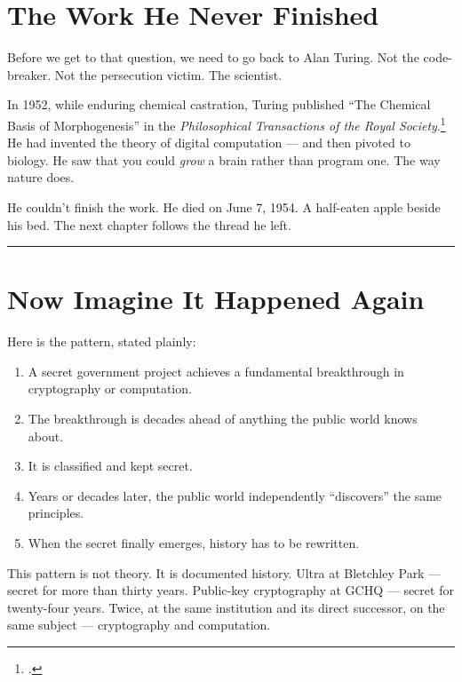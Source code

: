 \section*{The Work He Never Finished}
\label{spine:cw-the-work-he-never-finished}

Before we get to that question, we need to go back to Alan Turing. Not the code-breaker. Not the persecution victim. The scientist.

In 1952, while enduring chemical castration, Turing published ``The Chemical Basis of Morphogenesis'' in the \textit{Philosophical Transactions of the Royal Society}.\footcite{turing1952} He had invented the theory of digital computation --- and then pivoted to biology. He saw that you could \textit{grow} a brain rather than program one. The way nature does.

He couldn't finish the work. He died on June 7, 1954. A half-eaten apple beside his bed. The next chapter follows the thread he left.

\vspace{1cm}\noindent\rule{0.5\textwidth}{0.5pt}\vspace{0.5cm}

\section*{Now Imagine It Happened Again}
\label{spine:cw-now-imagine-it-happened-again}

Here is the pattern, stated plainly:

\begin{enumerate}
\item A secret government project achieves a fundamental breakthrough in cryptography or computation.
\item The breakthrough is decades ahead of anything the public world knows about.
\item It is classified and kept secret.
\item Years or decades later, the public world independently ``discovers'' the same principles.
\item When the secret finally emerges, history has to be rewritten.
\end{enumerate}

This pattern is not theory. It is documented history. Ultra at Bletchley Park --- secret for more than thirty years. Public-key cryptography at GCHQ --- secret for twenty-four years. Twice, at the same institution and its direct successor, on the same subject --- cryptography and computation.

